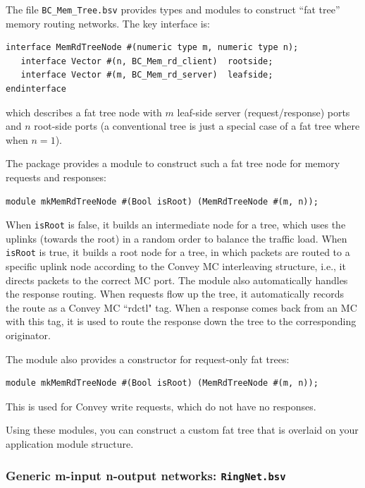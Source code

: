 \documentclass[twoside,letterpaper,11pt]{article}
\begin{document}
The file \verb|BC_Mem_Tree.bsv| provides types and modules to
construct ``fat tree'' memory routing networks.  The key interface is:
\begin{Verbatim}[frame=single, label=BC\_Mem\_Tree.bsv]
interface MemRdTreeNode #(numeric type m, numeric type n);
   interface Vector #(n, BC_Mem_rd_client)  rootside;
   interface Vector #(m, BC_Mem_rd_server)  leafside;
endinterface
\end{Verbatim}
which describes a fat tree node with $m$ leaf-side server
(request/response) ports and $n$ root-side ports (a conventional tree
is just a special case of a fat tree where when $n=1$).

The package provides a module to construct such a fat tree node for
memory requests and responses:
\begin{Verbatim}[frame=single, label=BC\_Mem\_Tree.bsv]
module mkMemRdTreeNode #(Bool isRoot) (MemRdTreeNode #(m, n));
\end{Verbatim}

When \verb|isRoot| is false, it builds an intermediate node for a
tree, which uses the uplinks (towards the root) in a random order to
balance the traffic load.  When \verb|isRoot| is true, it builds a
root node for a tree, in which packets are routed to a specific uplink
node according to the Convey MC interleaving structure, i.e., it
directs packets to the correct MC port.  The module also automatically
handles the response routing.  When requests flow up the tree, it
automatically records the route as a Convey MC ``rdctl" tag.  When a
response comes back from an MC with this tag, it is used to route the
response down the tree to the corresponding originator.

The module also provides a constructor for request-only fat trees:
\begin{Verbatim}[frame=single, label=BC\_Mem\_Tree.bsv]
module mkMemRdTreeNode #(Bool isRoot) (MemRdTreeNode #(m, n));
\end{Verbatim}
This is used for Convey write requests, which do not have no responses.

Using these modules, you can construct a custom fat tree that is
overlaid on your application module structure.


\subsubsection{Generic m-input n-output networks: {\tt RingNet.bsv}}
\end{document}

